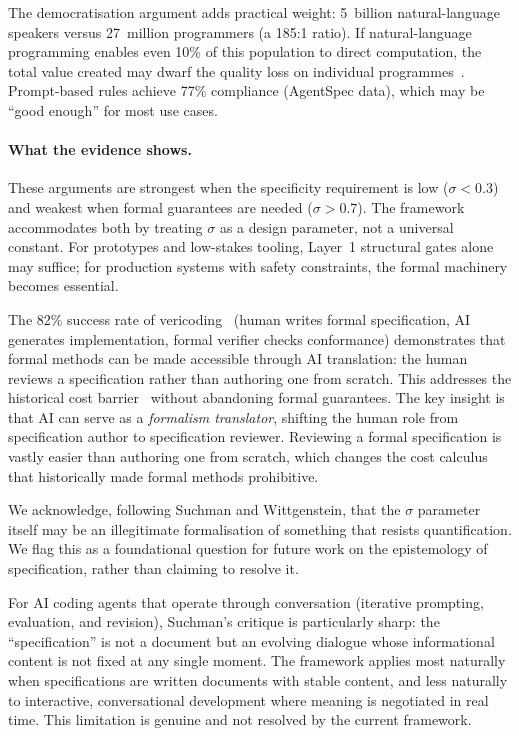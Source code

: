 \documentclass[11pt, a4paper, logo, copyright]{googledeepmind}
\begin{document}
The democratisation argument adds practical weight: 5~billion natural-language
speakers versus 27~million programmers (a 185:1 ratio).  If natural-language
programming enables even 10\% of this population to direct computation, the
total value created may dwarf the quality loss on individual
programmes~\citep{litt2023malleable, altman2024intelligence}.  Prompt-based
rules achieve 77\% compliance (AgentSpec data), which may be ``good enough''
for most use cases.

\paragraph{What the evidence shows.}
These arguments are strongest when the specificity requirement is low
($\sigma < 0.3$) and weakest when formal guarantees are needed
($\sigma > 0.7$).  The framework accommodates both by treating $\sigma$ as a
design parameter, not a universal constant.  For prototypes and low-stakes
tooling, Layer~1 structural gates alone may suffice; for production systems with
safety constraints, the formal machinery becomes essential.

The 82\% success rate of vericoding~\citep{vericoding2025} (human writes formal
specification, AI generates implementation, formal verifier checks conformance)
demonstrates that formal methods can be made accessible through AI translation:
the human reviews a specification rather than authoring one from scratch.  This
addresses the historical cost barrier~\citep{kleppmann2025formal} without
abandoning formal guarantees.  The key insight is that AI can serve as a
\emph{formalism translator}, shifting the human role from specification author
to specification reviewer.  Reviewing a formal specification is vastly easier
than authoring one from scratch, which changes the cost calculus that
historically made formal methods prohibitive.

We acknowledge, following Suchman and Wittgenstein, that the $\sigma$ parameter
itself may be an illegitimate formalisation of something that resists
quantification.  We flag this as a foundational question for future work on the
epistemology of specification, rather than claiming to resolve it.

For AI coding agents that operate through conversation (iterative prompting,
evaluation, and revision), Suchman's critique is particularly sharp: the
``specification'' is not a document but an evolving dialogue whose informational
content is not fixed at any single moment.  The framework applies most naturally
when specifications are written documents with stable content, and less
naturally to interactive, conversational development where meaning is negotiated
in real time.  This limitation is genuine and not resolved by the current
framework.
\end{document}
